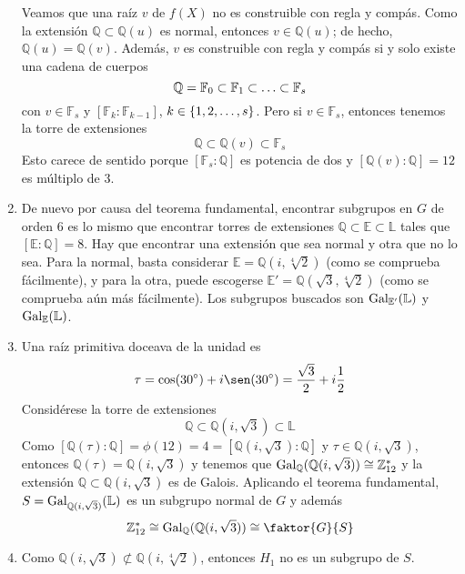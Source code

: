 \documentclass[11pt]{report}
\makeatletter
\renewenvironment{proof}[1][\proofname]{\par
  \pushQED{\qed}%
  \normalfont \topsep\z@skip %
  \trivlist
  \item[\hskip\labelsep
        \itshape
    #1\@addpunct{.}]\ignorespaces
}{%
  \popQED\endtrivlist\@endpefalse
}
\newcommand{\Z}{\mathbb Z}
\newcommand{\Q}{\mathbb Q}
\newcommand{\F}{\mathbb F}
\newcommand{\E}{\mathbb E}
\renewcommand{\L}{\mathbb L}
\makeatother
\begin{document}
\begin{proof}
\begin{enumerate}
    Veamos que una raíz $v$ de $f(X)$ no es construible con regla y compás. Como la extensión $\Q \subset \Q(u)$ es normal, entonces $v \in \Q(u)$; de hecho, $\Q(u)=\Q(v)$. Además, $v$ es construible con regla y compás si y solo existe una cadena de cuerpos
    \[\Q =\F_0 \subset \F_1 \subset \mathellipsis \subset \F_s\]
    con $v \in \F_s$ y $[\F_{k} \colon \F_{k-1}]$, $k \in \{1,2,\mathellipsis,s\}$. Pero si $v \in \F_s$, entonces tenemos la torre de extensiones
    \[\Q \subset \Q(v) \subset \F_s\]
    Esto carece de sentido porque $[\F_s \colon \Q]$ es potencia de dos y $[\Q(v) \colon \Q]=12$ es múltiplo de $3$.
    \item De nuevo por causa del teorema fundamental, encontrar subgrupos en $G$ de orden $6$ es lo mismo que encontrar torres de extensiones $\Q \subset \E \subset \L$ tales que $[\E \colon \Q] = 8$. Hay que encontrar una extensión que sea normal y otra que no lo sea. Para la normal, basta considerar $\E = \Q(i,\sqrt[4]{2})$ (como se comprueba fácilmente), y para la otra, puede escogerse $\E' = \Q(\sqrt{3},\sqrt[4]{2})$ (como se comprueba aún más fácilmente). Los subgrupos buscados son $\textup{Gal}_{\E'}(\L)$ y $\textup{Gal}_{\E}(\L)$.
    \item Una raíz primitiva doceava de la unidad es
    \[\tau = \cos(30^\circ)+i\sen(30^\circ) = \frac{\sqrt{3}}{2}+i\frac{1}{2}\]
    Considérese la torre de extensiones
    \[\Q \subset \Q(i,\sqrt{3}) \subset \L\]
    Como $[\Q(\tau) \colon \Q] = \phi(12)=4=[\Q(i,\sqrt{3}) \colon \Q]$ y $\tau \in \Q(i,\sqrt{3})$, entonces $\Q(\tau) = \Q(i,\sqrt{3})$ y tenemos que $\textup{Gal}_{\Q}(\Q(i,\sqrt{3})) \cong \Z_{12}^*$ y la extensión $\Q \subset \Q(i,\sqrt{3})$ es de Galois. Aplicando el teorema fundamental, $S = \textup{Gal}_{\Q(i,\sqrt{3})}(\L)$ es un subgrupo normal de $G$ y además
    \[\Z_{12}^* \cong \textup{Gal}_{\Q}(\Q(i,\sqrt{3})) \cong \faktor{G}{S}\]
    \item Como $\Q(i,\sqrt{3})\not\subset \Q(i,\sqrt[4]{2})$, entonces $H_1$ no es un subgrupo de $S$. \qedhere
\end{enumerate}
\end{proof}
\end{document}
